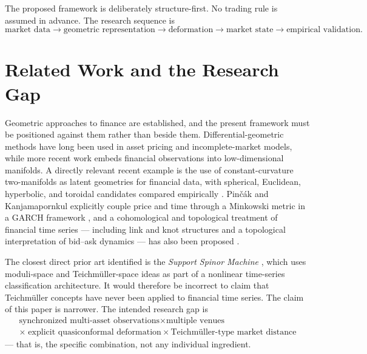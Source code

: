 \documentclass[11pt,a4paper]{article}
\numberwithin{equation}{section}
\begin{document}
The proposed framework is deliberately structure-first. No trading
rule is assumed in advance. The research sequence is
\[
\text{market data}
\rightarrow
\text{geometric representation}
\rightarrow
\text{deformation}
\rightarrow
\text{market state}
\rightarrow
\text{empirical validation}.
\]

\section{Related Work and the Research Gap}\label{sec:related}

Geometric approaches to finance are established, and the present
framework must be positioned against them rather than beside them.
Differential-geometric methods have long been used in asset pricing
and incomplete-market models, while more recent work embeds
financial observations into low-dimensional manifolds. A directly
relevant recent example is the use of constant-curvature
two-manifolds as latent geometries for financial data, with
spherical, Euclidean, hyperbolic, and toroidal candidates compared
empirically \cite{Papaioannou2025}. Pinčák and Kanjamapornkul
explicitly couple price and time through a Minkowski metric in a
GARCH framework \cite{PincakKanjamapornkul2018}, and a cohomological
and topological treatment of financial time series --- including
link and knot structures and a topological interpretation of
bid--ask dynamics --- has also been proposed
\cite{Kanjamapornkul2020}.

The closest direct prior art identified is the \emph{Support Spinor
Machine} \cite{Kanjamapornkul2017}, which uses moduli-space and
Teichmüller-space ideas as part of a nonlinear time-series
classification architecture. It would therefore be incorrect to
claim that Teichmüller concepts have never been applied to financial
time series. The claim of this paper is narrower. The intended
research gap is
\[
\boxed{
\begin{gathered}
\text{synchronized multi-asset observations}
\times
\text{multiple venues}\\
\times\;
\text{explicit quasiconformal deformation}
\times
\text{Teichmüller-type market distance}
\end{gathered}
}
\]
--- that is, the specific combination, not any individual
ingredient.
\end{document}
